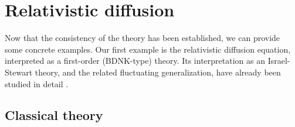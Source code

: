 \documentclass[a4paper, amsfonts, amssymb, amsmath, reprint, showkeys, nofootinbib, twoside,notitlepage,onecolumn]{revtex4-2}
\theoremstyle{definition}
\begin{document}
\section{Relativistic diffusion}\label{nondiffidate}

Now that the consistency of the theory has been established, we can provide some concrete examples. Our first example is the relativistic diffusion equation, interpreted as a first-order (BDNK-type) theory. Its interpretation as an Israel-Stewart theory, and the related fluctuating generalization, have already been studied in detail \cite{Mullins:2023tjg,Mullins:2023ott}.

\subsection{Classical theory}
\end{document}
